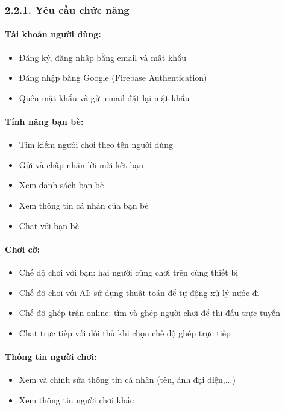 \documentclass[a4paper,12pt]{article}
\begin{document}
\subsubsection*{2.2.1. Yêu cầu chức năng} %

\paragraph{Tài khoản người dùng:} %
\begin{itemize}[label=·]
    \item Đăng ký, đăng nhập bằng email và mật khẩu
    \item Đăng nhập bằng Google (Firebase Authentication)
    \item Quên mật khẩu và gửi email đặt lại mật khẩu
\end{itemize}

\paragraph{Tính năng bạn bè:} %
\begin{itemize}[label=·]
    \item Tìm kiếm người chơi theo tên người dùng
    \item Gửi và chấp nhận lời mời kết bạn
    \item Xem danh sách bạn bè
    \item Xem thông tin cá nhân của bạn bè
    \item Chat với bạn bè
\end{itemize}

\paragraph{Chơi cờ:} %
\begin{itemize}[label=·]
    \item Chế độ chơi với bạn: hai người cùng chơi trên cùng thiết bị
    \item Chế độ chơi với AI: sử dụng thuật toán để tự động xử lý nước đi
    \item Chế độ ghép trận online: tìm và ghép người chơi để thi đấu trực tuyến
    \item Chat trực tiếp với đối thủ khi chọn chế độ ghép trực tiếp
\end{itemize}

\paragraph{Thông tin người chơi:} %
\begin{itemize}[label=·]
    \item Xem và chỉnh sửa thông tin cá nhân (tên, ảnh đại diện,...)
    \item Xem thông tin người chơi khác
\end{itemize}
\end{document}
